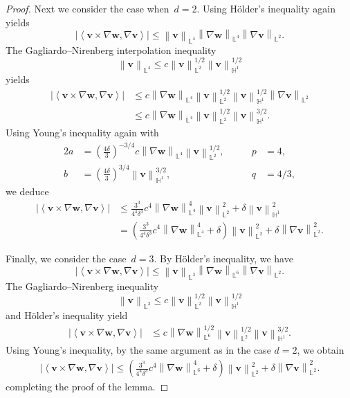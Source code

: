 \documentclass[11pt,reqno]{amsart}
\theoremstyle{definition}
\numberwithin{equation}{section}
\newcommand{\bff}{\boldsymbol}
\newcommand{\bb}{\mathbb}
\newcommand{\norm}[2]{\left\|{#1}\right\|_{#2}}
\newcommand{\inpro}[2]{\left\langle#1,#2\right\rangle}
\begin{document}
\begin{proof}
	
	Next we consider the case when~$d=2$. Using H\"older's inequality again
	yields
	\[
	\left|\inpro{\bff{v}\times\nabla\bff{w}}{\nabla\bff{v}}\right|
	\le
	\norm{\bff{v}}{\bb{L}^4}
	\norm{\nabla\bff{w}}{\bb{L}^4} 
	\norm{\nabla\bff{v}}{\bb{L}^2}.
	\]
	The Gagliardo--Nirenberg interpolation inequality
	\[
	\norm{\bff{v}}{\bb{L}^4}
	\le
	c\norm{\bff{v}}{\bb{L}^2}^{1/2}\norm{\bff{v}}{\bb{H}^1}^{1/2}
	\]
	yields
	\begin{align*}
		\left|\inpro{\bff{v}\times\nabla\bff{w}}{\nabla\bff{v}}\right|
		&\le
		c
		\norm{\nabla\bff{w}}{\bb{L}^4}
		\norm{\bff{v}}{\bb{L}^2}^{1/2}
		\norm{\bff{v}}{\bb{H}^1}^{1/2}
		\norm{\nabla\bff{v}}{\bb{L}^2}
		\\
		&\le
		c
		\norm{\nabla\bff{w}}{\bb{L}^4}
		\norm{\bff{v}}{\bb{L}^2}^{1/2}
		\norm{\bff{v}}{\bb{H}^1}^{3/2}.
	\end{align*}
	Using Young's inequality again with
	\begin{alignat*}{2}
		a
		&=
		\left(\frac{4\delta}{3}\right)^{-3/4}
		c
		\norm{\nabla\bff{w}}{\bb{L}^4}
		\norm{\bff{v}}{\bb{L}^2}^{1/2}, \qquad
		&
		p &= 4,
		\\
		b
		&=
		\left(\frac{4\delta}{3}\right)^{3/4}
		\norm{\bff{v}}{\bb{H}^1}^{3/2}, \quad
		&
		q &= 4/3,
	\end{alignat*}
	we deduce 
	\begin{align*}
		\left|\inpro{\bff{v}\times\nabla\bff{w}}{\nabla\bff{v}}\right|
		&\le
		\frac{3^3}{4^4 \delta^3} c^4
		\norm{\nabla\bff{w}}{\bb{L}^4}^4
		\norm{\bff{v}}{\bb{L}^2}^{2}
		+
		\delta
		\norm{\bff{v}}{\bb{H}^1}^{2}
		\\
		&=
		\left(
		\frac{3^3}{4^4 \delta^3} c^4
		\norm{\nabla\bff{w}}{\bb{L}^4}^4
		+ \delta
		\right)
		\norm{\bff{v}}{\bb{L}^2}^{2}
		+
		\delta
		\norm{\nabla\bff{v}}{\bb{L}^2}^{2}.
	\end{align*}
	
	Finally, we consider the case~$d=3$. By H\"older's inequality, we have 
	\[
	\left|\inpro{\bff{v}\times\nabla\bff{w}}{\nabla\bff{v}}\right|
	\le
	\norm{\bff{v}}{\bb{L}^3}
	\norm{\nabla\bff{w}}{\bb{L}^6} 
	\norm{\nabla\bff{v}}{\bb{L}^2}.
	\]
	The Gagliardo--Nirenberg inequality
	\[
	\norm{\bff{v}}{\bb{L}^3}
	\le
	c
	\norm{\bff{v}}{\bb{L}^2}^{1/2} 
	\norm{\bff{v}}{\bb{H}^1}^{1/2}
	\]
	and H\"older's inequality yield
	\begin{align*} 
		\left|\inpro{\bff{v}\times\nabla\bff{w}}{\nabla\bff{v}}\right|
		&\le
		c
		\norm{\nabla\bff{w}}{\bb{L}^6}^{1/2}
		\norm{\bff{v}}{\bb{L}^2}^{1/2}
		\norm{\bff{v}}{\bb{H}^1}^{3/2}.
	\end{align*}
	Using Young's inequality, by the same argument as in the case $d=2$, we obtain
	\begin{align*}
		\left|\inpro{\bff{v}\times\nabla\bff{w}}{\nabla\bff{v}}\right|
		\leq
		\left(
		\frac{3^3}{4^4 \delta^3} c^4
		\norm{\nabla\bff{w}}{\bb{L}^6}^4
		+ \delta
		\right)
		\norm{\bff{v}}{\bb{L}^2}^{2}
		+
		\delta
		\norm{\nabla\bff{v}}{\bb{L}^2}^{2}.
	\end{align*}
	completing the proof of the lemma.
\end{proof}
\end{document}
